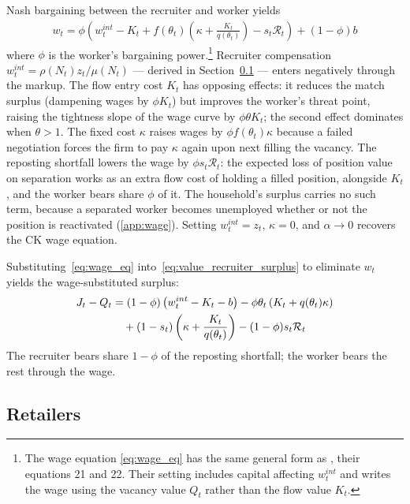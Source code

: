 \documentclass[authoryear, review, 12pt]{elsarticle}
\begin{document}
	Nash bargaining between the recruiter and worker yields
	\begin{align}\label{eq:wage_eq}
		w_t = \phi\left(w_t^{int} - K_t 
		+ f(\theta_t)\left(\kappa
		+\frac{K_t}{q(\theta_t)}\right)-s_t\mathcal{R}_t\right)
		+(1-\phi)b
	\end{align}
	where $\phi$ is the worker's bargaining power.\footnote{The 
		wage equation \eqref{eq:wage_eq} has the same general form as 
		\citet{shao_2013}, their equations 21 and 22. Their setting 
		includes capital affecting $w_t^{int}$ and writes the wage 
		using the vacancy value $Q_t$ rather than the flow value 
		$K_t$.} Recruiter compensation $w_t^{int}=\rho(N_t)z_t/
	\mu(N_t)$ — derived in Section~\ref{sec:retailers} — enters 
	negatively through the markup. The flow entry cost $K_t$ has 
	opposing effects: it reduces the match surplus (dampening 
	wages by $\phi K_t$) but improves the worker's threat point, 
	raising the tightness slope of the wage curve by $\phi\theta 
	K_t$; the second effect dominates when $\theta>1$. The fixed 
	cost $\kappa$ raises wages by $\phi f(\theta_t)\kappa$ because 
	a failed negotiation forces the firm to pay $\kappa$ again 
	upon next filling the vacancy. The reposting shortfall lowers
	the wage by $\phi s_t\mathcal{R}_t$: the expected loss of position value on separation works
	as an extra flow cost of holding a filled position, alongside $K_t$, and the worker bears
	share $\phi$ of it. The household's
	surplus carries no such term, because a separated worker
	becomes unemployed whether or not the position is reactivated
	(\ref{app:wage}). Setting $w_t^{int}=z_t$,
	$\kappa=0$, and $\alpha\to0$ recovers the CK wage equation.

	Substituting~\eqref{eq:wage_eq}
	into~\eqref{eq:value_recruiter_surplus} to eliminate $w_t$
	yields the wage-substituted surplus:
	\begin{align}\label{eq:surplus_wage}
		J_t-Q_t &= (1-\phi)\left(w_t^{int}-K_t-b\right)
		-\phi\theta_t\left(K_t+q(\theta_t)\kappa\right) \notag \\
		&\quad +(1-s_t)\left(\kappa+\frac{K_t}{q(\theta_t)}\right)
		-(1-\phi)s_t\mathcal{R}_t
	\end{align}
	The recruiter bears share $1-\phi$ of the reposting shortfall;
	the worker bears the rest through the wage.

	\subsection{Retailers}\label{sec:retailers}
	
\end{document}
